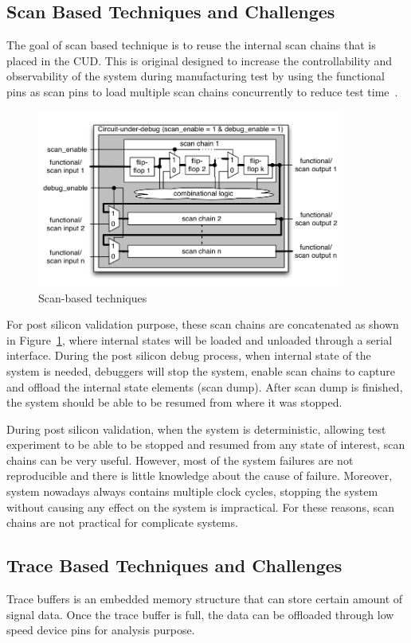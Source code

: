 \documentclass[12pt,frontmatter,copyright,thesis]{usfmanus}
\begin{document}
\subsection{Scan Based Techniques and Challenges}
The goal of scan based technique is to
reuse the internal scan chains that is
placed in the CUD.
This is original designed to increase
the controllability and observability of the system
during manufacturing test by using the functional pins as scan pins to load 
multiple scan chains concurrently to reduce test time~\cite{nicolici2009design}.


\begin{figure}[h]
\centering
\includegraphics[width=0.9\textwidth]{scanchains.png}
\caption{Scan-based techniques~\cite{nicolici2009design}}
\label{sss}
\end{figure}
For post silicon validation purpose, these
scan chains are concatenated as shown in Figure~\ref{sss},
where internal states will be loaded and unloaded through
a serial interface.
During the post silicon debug process, 
when internal state of the system is needed,
debuggers will stop the system, enable scan chains to capture 
and offload the
internal state elements (scan dump). 
After scan dump is finished, the system should be able
to be resumed from where it was stopped.

During post silicon validation, when the system is deterministic,
allowing test experiment to be able to be stopped and resumed
from any state of interest,
scan chains can be very useful.
However, most of the system failures are not reproducible and 
there is little knowledge about
the cause of failure. Moreover,
system nowadays always contains multiple
clock cycles, stopping the system
without causing any effect on the
system is impractical. For these reasons, scan chains are not
practical for complicate systems.

\subsection{Trace Based Techniques and Challenges}
Trace buffers is an embedded memory structure that can 
store certain amount of signal data. Once the trace buffer is full, 
the data can be offloaded through low speed device pins for analysis
purpose.
\end{document}
